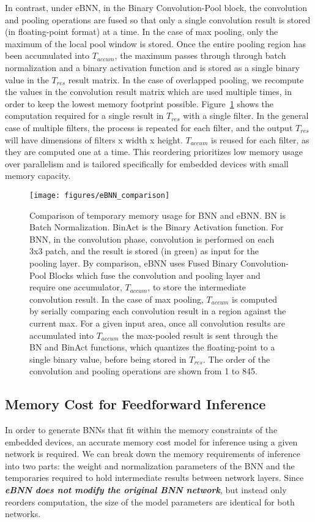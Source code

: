 \documentclass[10pt,emptycopyrightspace]{ewsn-proc}
\begin{document}
In contrast, under eBNN, in the Binary Convolution-Pool block, the convolution and pooling operations are fused so that only a single convolution result is stored (in floating-point format) at a time. In the case of max pooling, only the maximum of the local pool window is stored. Once the entire pooling region has been accumulated into $T_{accum}$, the maximum passes through through batch normalization and a binary activation function and is stored as a single binary value in the $T_{res}$ result matrix. In the case of overlapped pooling, we recompute the values in the convolution result matrix which are used multiple times, in order to keep the lowest memory footprint possible. Figure~\ref{fig:eBNN_comparison} shows the computation required for a single result in $T_{res}$ with a single filter. In the general case of multiple filters, the process is repeated for each filter, and the output $T_{res}$ will have dimensions of filters x width x height. $T_{accum}$ is reused for each filter, as they are computed one at a time. This reordering prioritizes low memory usage over parallelism and is tailored specifically for embedded devices with small memory capacity.

\begin{figure}[b!]
  \centering
    \texttt{[image: figures/eBNN\_comparison]}
  \caption{Comparison of temporary memory usage for BNN and eBNN. BN is Batch Normalization. BinAct is the Binary Activation function. For BNN, in the convolution phase, convolution is performed on each 3x3 patch, and the result is stored (in green) as input for the pooling layer. By comparison, eBNN uses Fused Binary Convolution-Pool Blocks which fuse the convolution and pooling layer and require one accumulator, $T_{accum}$, to store the intermediate convolution result. In the case of max pooling, $T_{accum}$ is computed by serially comparing each convolution result in a region against the current max. For a given input area, once all convolution results are accumulated into $T_{accum}$ the max-pooled result is sent through the BN and BinAct functions, which quantizes the floating-point to a single binary value, before being stored in $T_{res}$. The order of the convolution and pooling operations are shown from 1 to 845.}
  \label{fig:eBNN_comparison}
\end{figure}

\subsection{Memory Cost for Feedforward Inference}
In order to generate BNNs that fit within the memory constraints of the embedded devices, an accurate memory cost model for inference using a given network is required. We can break down the memory requirements of inference into two parts: the weight and normalization parameters of the BNN and the temporaries required to hold intermediate results between network layers. Since \textbf{\textit{eBNN does not modify the original BNN network}}, but instead only reorders computation, the size of the model parameters are identical for both networks.
\end{document}
